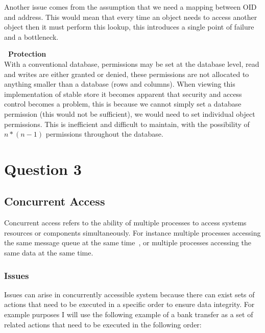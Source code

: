 \documentclass[a4paper,12pt]{article}
\begin{document}
Another issue comes from the assumption that we need a mapping between OID and address.
This would mean that every time an object needs to access another object then it must perform this lookup, this introduces a single point of failure and a bottleneck.
\par\textbf{\indent~Protection}\\
With a conventional database, permissions may be set at the database level, read and writes are either granted or denied, these permissions are not allocated to anything smaller than a database (rows and columns).
When viewing this implementation of stable store it becomes apparent that security and access control becomes a problem, this is because we cannot simply set a database permission (this would not be sufficient), we would need to set individual object permissions.
This is inefficient and difficult to maintain, with the possibility of $n*(n-1)$ permissions throughout the database.





\section*{Question 3}

\subsection*{Concurrent Access}
Concurrent access refers to the ability of multiple processes to access systems resources or components simultaneously. 
For instance multiple processes accessing the same message queue at the same time~\citep{managing-concurrent-access}, or multiple processes accessing the same data at the same time.
\subsubsection*{Issues}
Issues can arise in concurrently accessible system because there can exist sets of actions that need to be executed in a specific order to ensure data integrity.
For example purposes I will use the following example of a bank transfer as a set of related actions that need to be executed in the following order:
\end{document}
